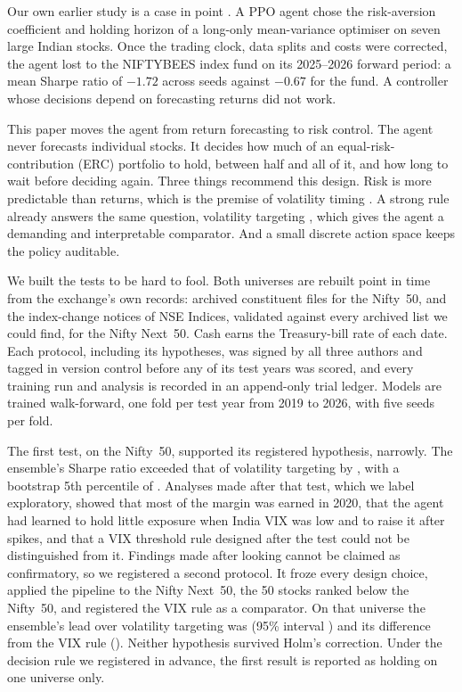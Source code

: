 \documentclass[11pt]{article}
\begin{document}
Our own earlier study is a case in point \citep{parulekar2026}. A PPO agent chose the risk-aversion coefficient and holding horizon of a long-only mean-variance optimiser on seven large Indian stocks. Once the trading clock, data splits and costs were corrected, the agent lost to the NIFTYBEES index fund on its 2025--2026 forward period: a mean Sharpe ratio of $-1.72$ across seeds against $-0.67$ for the fund. A controller whose decisions depend on forecasting returns did not work.

This paper moves the agent from return forecasting to risk control. The agent never forecasts individual stocks. It decides how much of an equal-risk-contribution (ERC) portfolio to hold, between half and all of it, and how long to wait before deciding again. Three things recommend this design. Risk is more predictable than returns, which is the premise of volatility timing \citep{fleming2001,moreira2017}. A strong rule already answers the same question, volatility targeting \citep{harvey2018vt}, which gives the agent a demanding and interpretable comparator. And a small discrete action space keeps the policy auditable.

We built the tests to be hard to fool. Both universes are rebuilt point in time from the exchange's own records: archived constituent files for the Nifty~50, and the index-change notices of NSE Indices, validated against every archived list we could find, for the Nifty Next~50. Cash earns the Treasury-bill rate of each date. Each protocol, including its hypotheses, was signed by all three authors and tagged in version control before any of its test years was scored, and every training run and analysis is recorded in an append-only trial ledger. Models are trained walk-forward, one fold per test year from 2019 to 2026, with five seeds per fold.

The first test, on the Nifty~50, supported its registered hypothesis, narrowly. The ensemble's Sharpe ratio exceeded that of volatility targeting by \HiDelta{}, with a bootstrap 5th percentile of \HiPfive{}. Analyses made after that test, which we label exploratory, showed that most of the margin was earned in 2020, that the agent had learned to hold little exposure when India VIX was low and to raise it after spikes, and that a VIX threshold rule designed after the test could not be distinguished from it. Findings made after looking cannot be claimed as confirmatory, so we registered a second protocol. It froze every design choice, applied the pipeline to the Nifty Next~50, the 50 stocks ranked below the Nifty~50, and registered the VIX rule as a comparator. On that universe the ensemble's lead over volatility targeting was \NxHOneDelta{} (95\% interval \NxHOneCI{}) and its difference from the VIX rule \NxHTwoDelta{} (\NxHTwoCI{}). Neither hypothesis survived Holm's correction. Under the decision rule we registered in advance, the first result is reported as holding on one universe only.
\end{document}
